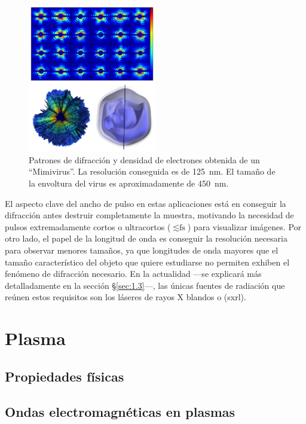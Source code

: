 \begin{figure}[ht!]
    \centering
    \includegraphics[width=0.5\textwidth]{Figuras/ch1_pulso.png}
    \caption{Patrones de difracción y densidad de electrones obtenida de un \enquote{Mimivirus}\autocite{Ekeberg2015Three-DimensionalLaser}. La resolución conseguida es de \qty{125}{\nm}. El tamaño de la envoltura del virus es aproximadamente de \qty{450}{\nm}.}
    \label{fig:ch1_pulso}
\end{figure}

El aspecto clave del ancho de pulso en estas aplicaciones está en conseguir la difracción antes destruir completamente la muestra\autocite{Neutze2000PotentialPulses}, motivando la necesidad de pulsos extremadamente cortos o ultracortos ($\lesssim\unit{\fs}$) para visualizar imágenes. Por otro lado, el papel de la longitud de onda es conseguir la resolución necesaria para observar menores tamaños, ya que longitudes de onda mayores que el tamaño característico del objeto que quiere estudiarse no permiten exhiben el fenómeno de difracción necesario. En la actualidad ---se explicará más detalladamente en la sección \S\ref{sec:1.3}---, las únicas fuentes de radiación que reúnen estos requisitos son los láseres de rayos X blandos o \emph{} (\acrshort{sxrl}).

\section{Plasma}\label{sec:1.2}

\subsection{Propiedades físicas}\label{sec:1.2.1}

\subsection{Ondas electromagnéticas en plasmas}\label{sec:1.2.2}

